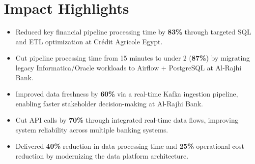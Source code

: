 \section{Impact Highlights}

\begin{itemize}
  \item Reduced key financial pipeline processing time by \textbf{83\%} through targeted SQL
        and ETL optimization at Crédit Agricole Egypt.

  \item Cut pipeline processing time from 15 minutes to under 2 (\textbf{87\%}) by migrating
        legacy Informatica/Oracle workloads to Airflow + PostgreSQL at Al-Rajhi Bank.

  \item Improved data freshness by \textbf{60\%} via a real-time Kafka ingestion pipeline,
        enabling faster stakeholder decision-making at Al-Rajhi Bank.

  \item Cut API calls by \textbf{70\%} through integrated real-time data flows, improving
        system reliability across multiple banking systems.

  \item Delivered \textbf{40\%} reduction in data processing time and \textbf{25\%}
        operational cost reduction by modernizing the data platform architecture.
\end{itemize}
